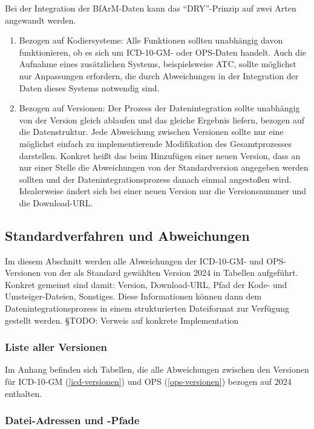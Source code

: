 \newpage %

Bei der Integration der BfArM-Daten kann das ``DRY''-Prinzip auf zwei Arten angewandt werden.

\begin{enumerate}
\item Bezogen auf Kodiersysteme: Alle Funktionen sollten unabhängig davon funktionieren, ob es sich um ICD-10-GM- oder OPS-Daten handelt. Auch die Aufnahme eines zusätzlichen Systems, beispielsweise ATC, sollte möglichst nur Anpassungen erfordern, die durch Abweichungen in der Integration der Daten dieses Systems notwendig sind. 
\item Bezogen auf Versionen: Der Prozess der Datenintegration sollte unabhängig von der Version gleich ablaufen und das gleiche Ergebnis liefern, bezogen auf die Datenstruktur. Jede Abweichung zwischen Versionen sollte nur eine möglichst einfach zu implementierende Modifikation des Gesamtprozesses darstellen. Konkret heißt das beim Hinzufügen einer neuen Version, dass an nur einer Stelle die Abweichungen von der Standardversion angegeben werden sollten und der Datenintegrationsprozess danach einmal angestoßen wird. Idealerweise ändert sich bei einer neuen Version nur die Versionsnummer und die Download-URL. 
\end{enumerate}

\subsection{Standardverfahren und Abweichungen}

Im diesem Abschnitt werden alle Abweichungen der ICD-10-GM- und OPS-Versionen von der als Standard gewählten Version 2024 in Tabellen aufgeführt. Konkret gemeinst sind damit: Version, Download-URL, Pfad der Kode- und Umsteiger-Dateien, Sonstiges. Diese Informationen können dann dem Datenintegrationsprozess in einem strukturierten Dateiformat zur Verfügung gestellt werden. {\color{blue} §TODO: Verweis auf konkrete Implementation}

\subsubsection{Liste aller Versionen}

Im Anhang befinden sich Tabellen, die alle Abweichungen zwischen den Versionen für ICD-10-GM (\ref{icd-versionen}) und OPS (\ref{ops-versionen}) bezogen auf 2024 enthalten.

\subsubsection{Datei-Adressen und -Pfade}

